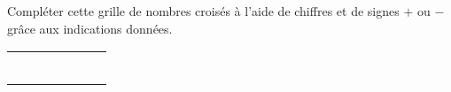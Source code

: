    Compléter cette grille de nombres croisés à l'aide de chiffres et de signes \og $+$ \fg{} ou \og $-$ \fg{} grâce aux indications données.
   \begin{center}
   {
   \begin{tabular}{|*{7}{C{0.57}|}}
      \hline
      &  &  &  &  &  &  \\
      \hline
       & &  & & &  & \\
      \hline
       & & & &  & & \\
      \hline
       & &  &  & & &  \\
      \hline
       &  & & &  &  & \\
      \hline
       & & &  & & & \\
      \hline
       & &  & & & &  \\
      \hline
   \end{tabular}}
   \end{center}
   \bigskip
